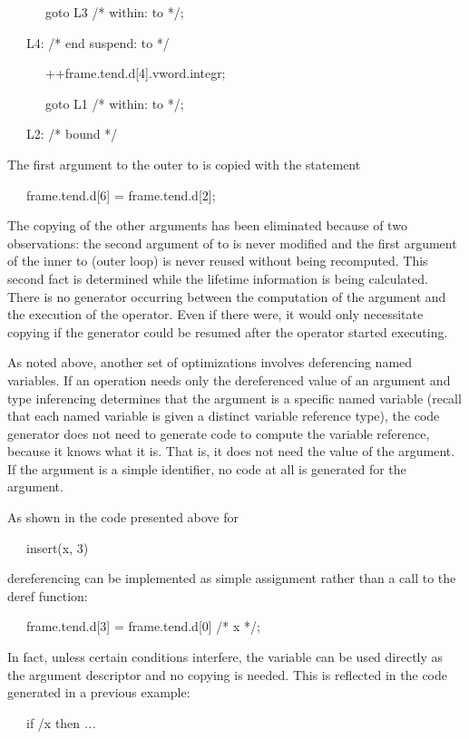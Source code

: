 {\ttfamily\mdseries
\ \ \ \ \ \ goto L3 /* within: to */;}

{\ttfamily\mdseries
\ \ \ L4: /* end suspend: to */}

{\ttfamily\mdseries
\ \ \ \ \ \ ++frame.tend.d[4].vword.integr;}

{\ttfamily\mdseries
\ \ \ \ \ \ goto L1 /* within: to */;}

{\ttfamily\mdseries
\ \ \ L2: /* bound */}


The first argument to the outer to is copied with the statement 

{\ttfamily\mdseries
\ \ \ frame.tend.d[6] = frame.tend.d[2];}


The copying of the other arguments has been eliminated because of two
observations: the second argument of to is never modified and the
first argument of the inner to (outer loop) is never reused without
being recomputed. This second fact is determined while the lifetime
information is being calculated. There is no generator occurring
between the computation of the argument and the execution of the
operator. Even if there were, it would only necessitate copying if the
generator could be resumed after the operator started executing.

As noted above, another set of optimizations involves deferencing
named variables. If an operation needs only the dereferenced value of
an argument and type inferencing determines that the argument is a
specific named variable (recall that each named variable is given a
distinct variable reference type), the code generator does not need to
generate code to compute the variable reference, because it knows what
it is. That is, it does not need the value of the argument. If the
argument is a simple identifier, no code at all is generated for the
argument.

As shown in the code presented above for 

{\ttfamily\mdseries
\ \ \ insert(x, 3)}

\noindent
dereferencing can be implemented as simple assignment rather than a
call to the deref function:

{\ttfamily\mdseries
\ \ \ frame.tend.d[3] = frame.tend.d[0] /* x */;}


In fact, unless certain conditions interfere, the variable can be used
directly as the argument descriptor and no copying is needed. This is
reflected in the code generated in a previous example:

{\ttfamily\mdseries
\ \ \ if /x then \textit{...}}


